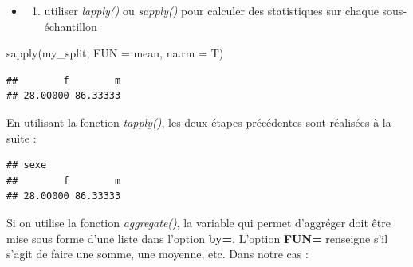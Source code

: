 \documentclass[
]{book}
\newenvironment{Shaded}{\begin{snugshade}}{\end{snugshade}}
\newcommand{\AttributeTok}[1]{\textcolor[rgb]{0.77,0.63,0.00}{#1}}
\newcommand{\ConstantTok}[1]{\textcolor[rgb]{0.00,0.00,0.00}{#1}}
\newcommand{\FunctionTok}[1]{\textcolor[rgb]{0.00,0.00,0.00}{#1}}
\newcommand{\NormalTok}[1]{#1}
\newcommand{\SpecialCharTok}[1]{\textcolor[rgb]{0.00,0.00,0.00}{#1}}
\providecommand{\tightlist}{%
  \setlength{\itemsep}{0pt}\setlength{\parskip}{0pt}}
\theoremstyle{definition}
\theoremstyle{definition}
\theoremstyle{definition}
\theoremstyle{definition}
\theoremstyle{remark}
\begin{document}
\begin{itemize}
\item
  \begin{enumerate}
  \def\labelenumi{\arabic{enumi}.}
  \setcounter{enumi}{1}
  \tightlist
  \item
    utiliser \emph{lapply()} ou \emph{sapply()} pour calculer des statistiques sur chaque sous-échantillon
  \end{enumerate}
\end{itemize}

\begin{Shaded}
\begin{Highlighting}[]
\FunctionTok{sapply}\NormalTok{(my\_split, }\AttributeTok{FUN =}\NormalTok{ mean, }\AttributeTok{na.rm =}\NormalTok{ T)}
\end{Highlighting}
\end{Shaded}

\begin{verbatim}
##        f        m 
## 28.00000 86.33333
\end{verbatim}

En utilisant la fonction \emph{tapply()}, les deux étapes précédentes sont réalisées à la suite :

\begin{Shaded}
\end{Shaded}

\begin{verbatim}
## sexe
##        f        m 
## 28.00000 86.33333
\end{verbatim}

Si on utilise la fonction \emph{aggregate()}, la variable qui permet d'aggréger doit être mise sous forme d'une liste dans l'option \textbf{by=}. L'option \textbf{FUN=} renseigne s'il s'agit de faire une somme, une moyenne, etc. Dans notre cas :

\begin{Shaded}
\end{Shaded}
\end{document}
